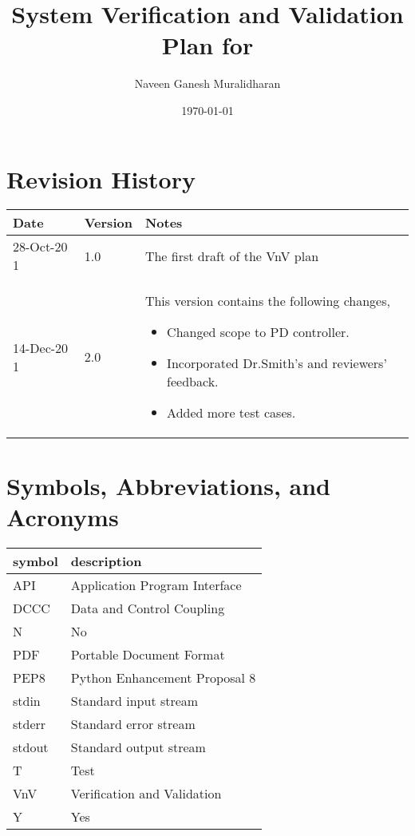\documentclass[12pt, titlepage]{article}
\begin{document}
\title{System Verification and Validation Plan for \progname{}} 
\author{Naveen Ganesh Muralidharan}
\date{\today}
	
\maketitle


\section{Revision History}

\begin{tabularx}{\textwidth}{p{3cm}p{2cm}X}
\toprule {\bf Date} & {\bf Version} & {\bf Notes}\\
\midrule
28-Oct-20 1 & 1.0 & The first draft of the VnV plan\\
14-Dec-20 1 & 2.0 & This version contains the following changes,
\begin{itemize}
\item Changed scope to PD controller.
\item Incorporated Dr.Smith's and reviewers' feedback.
\item Added more test cases.
\end{itemize}
\\
\bottomrule
\end{tabularx}

\newpage

\tableofcontents

\listoftables

\newpage

\section{Symbols, Abbreviations, and Acronyms}

\renewcommand{\arraystretch}{1.2}
\begin{tabular}{l l} 
  \toprule		
  \textbf{symbol} & \textbf{description}\\
  \midrule 
  API & Application Program Interface\\
  DCCC & Data and Control Coupling\\
  N & No\\
  PDF & Portable Document Format \\
  PEP8 & Python Enhancement Proposal 8\\
  stdin & Standard input stream\\
  stderr & Standard error stream\\
  stdout & Standard output stream\\
  T & Test\\
  VnV & Verification and Validation\\
  Y & Yes\\
  \bottomrule
\end{tabular}\\
\end{document}
